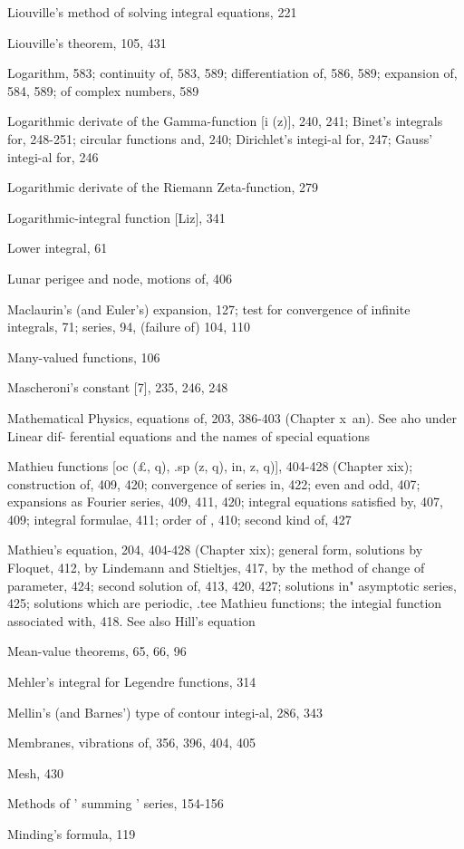 Liouville's method of solving integral equations, 221

Liouville's theorem, 105, 431

Logarithm, 583; continuity of, 583, 589; differentiation of, 586, 589; expansion of, 584, 589;
of complex numbers, 589

Logarithmic derivate of the Gamma-function [i (z)], 240, 241; Binet's integrals for, 248-251;
circular functions and, 240; Dirichlet's integi-al for, 247; Gauss' integi-al for, 246

Logarithmic derivate of the Riemann Zeta-function, 279

Logarithmic-integral function [Liz], 341

Lower integral, 61

Lunar perigee and node, motions of, 406

Maclaurin's (and Euler's) expansion, 127; test for convergence of infinite integrals, 71; series,
94, (failure of) 104, 110

Many-valued functions, 106

Mascheroni's constant [7], 235, 246, 248

Mathematical Physics, equations of, 203, 386-403 (Chapter x\ an). See aho under Linear dif-
ferential equations and the names of special equations

Mathieu functions [oc (£, q), .sp (z, q), in,  z, q)], 404-428 (Chapter xix); construction of, 409,
420; convergence of series in, 422; even and odd, 407; expansions as Fourier series, 409,
411, 420; integral equations satisfied by, 407, 409; integral formulae, 411; order of , 410;
second kind of, 427

Mathieu's equation, 204, 404-428 (Chapter xix); general form, solutions by Floquet, 412, by
Lindemann and Stieltjes, 417, by the method of change of parameter, 424; second solution
of, 413, 420, 427; solutions in" asymptotic series, 425; solutions which are periodic, .tee
Mathieu functions; the integial function associated with, 418. See also Hill's equation

Mean-value theorems, 65, 66, 96

Mehler's integral for Legendre functions, 314

Mellin's (and Barnes') type of contour integi-al, 286, 343

Membranes, vibrations of, 356, 396, 404, 405

Mesh, 430

Methods of ' summing ' series, 154-156

Minding's formula, 119

